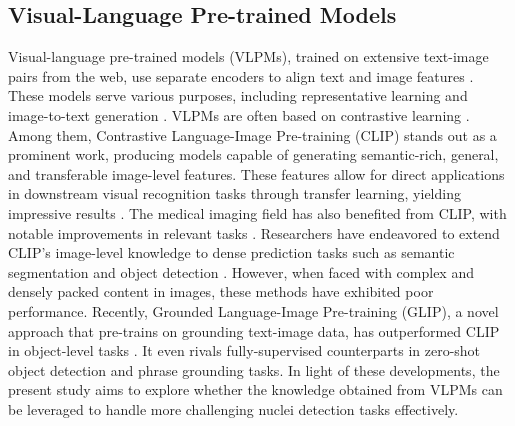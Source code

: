 \documentclass[journal,twoside,web]{ieeecolor}
\begin{document}
\subsection{Visual-Language Pre-trained Models}\; Visual-language pre-trained models (VLPMs), trained on extensive text-image pairs from the web, use separate encoders to align text and image features \cite{chen2023vlp}. These models serve various purposes, including representative learning \cite{radford2021learning} and image-to-text generation \cite{li2022blip}. VLPMs are often based on contrastive learning \cite{jaiswal2020survey,radford2021learning}. Among them, Contrastive Language-Image Pre-training (CLIP) \cite{radford2021learning} stands out as a prominent work, producing models capable of generating semantic-rich, general, and transferable image-level features. These features allow for direct applications in downstream visual recognition tasks through transfer learning, yielding impressive results \cite{patashnik2021styleclip,li2022blip,zhou2022extract,zhao2022exploiting,lin2022learning}. The medical imaging field has also benefited from CLIP, with notable improvements in relevant tasks \cite{eslami2021does,liu2023clip}. Researchers have endeavored to extend CLIP's image-level knowledge to dense prediction tasks such as semantic segmentation \cite{zhou2022extract} and object detection \cite{zhao2022exploiting,lin2022learning}. However, when faced with complex and densely packed content in images, these methods have exhibited poor performance. Recently, Grounded Language-Image Pre-training (GLIP), a novel approach that pre-trains on grounding text-image data, has outperformed CLIP in object-level tasks \cite{li2022grounded}. It even rivals fully-supervised counterparts in zero-shot object detection and phrase grounding tasks. In light of these developments, the present study aims to explore whether the knowledge obtained from VLPMs can be leveraged to handle more challenging nuclei detection tasks effectively.
\end{document}
